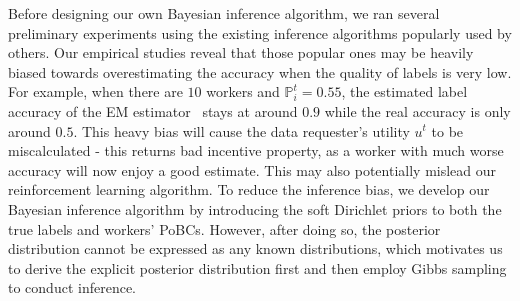 
Before designing our own Bayesian inference algorithm, we ran several preliminary experiments using the existing inference algorithms popularly used by others. Our empirical studies reveal that those popular ones may be heavily biased towards overestimating the accuracy when the quality of labels is very low. For example, when there are $10$ workers and $\mathbb{P}^t_i=0.55$, the estimated label accuracy of the EM estimator~\cite{dawid1979maximum,raykar2010learning} stays at around $0.9$ while the real accuracy is only around $0.5$. This heavy bias will cause the data requester's utility $u^t$ to be miscalculated - this returns bad incentive property, as a worker with much worse accuracy will now enjoy a good estimate. This may also potentially mislead our reinforcement learning algorithm. To reduce the inference bias, we develop our Bayesian inference algorithm by introducing the soft Dirichlet priors to both the true labels and workers' PoBCs. However, after doing so, the posterior distribution cannot be expressed as any known distributions, which motivates us to derive the explicit posterior distribution first and then employ Gibbs sampling to conduct inference.


